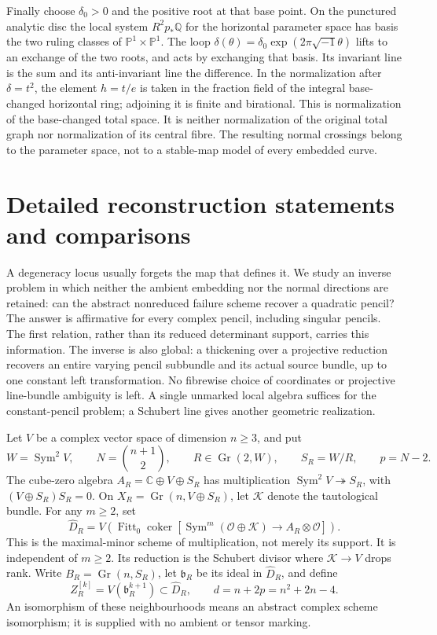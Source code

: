 \documentclass[11pt,reqno]{amsart}
\numberwithin{equation}{section}
\theoremstyle{definition}\newtheorem{definition}[theorem]{Definition}
\theoremstyle{remark}\newtheorem{remark}[theorem]{Remark}
\newcommand{\C}{\mathbb C}\newcommand{\Q}{\mathbb Q}
\newcommand{\Pj}{\mathbb P}\newcommand{\A}{\mathbb A}
\newcommand{\OO}{\mathcal O}\newcommand{\II}{\mathcal I}
\DeclareMathOperator{\Sym}{Sym}\DeclareMathOperator{\Gr}{Gr}
\DeclareMathOperator{\Fitt}{Fitt}\DeclareMathOperator{\Ann}{Ann}
\DeclareMathOperator{\coker}{coker}\DeclareMathOperator{\codim}{codim}
\begin{document}
Finally choose $\delta_0>0$ and the positive root at that base point.
On the punctured analytic disc the local system
$R^2p_*\Q$ for the horizontal parameter space has basis the two
ruling classes of $\Pj^1\times\Pj^1$. The loop
$\delta(\theta)=\delta_0\exp(2\pi\sqrt{-1}\theta)$ lifts to an
exchange of the two roots, and acts by exchanging that basis.
Its invariant line is the sum and its anti-invariant line the
difference. In the normalization after $\delta=t^2$, the element
$h=t/e$ is taken in the fraction field of the integral base-changed
horizontal ring; adjoining it is finite and birational. This is
normalization of the base-changed total space. It is neither
normalization of the original total graph nor normalization of
its central fibre. The resulting normal crossings belong to the
parameter space, not to a stable-map model of every embedded curve.


\section{Detailed reconstruction statements and comparisons}
\label{sec:introduction-v132}

A degeneracy locus usually forgets the map that defines it.  We study
an inverse problem in which neither the ambient embedding nor the
normal directions are retained: can the abstract nonreduced failure
scheme recover a quadratic pencil?  The answer is affirmative for
every complex pencil, including singular pencils.  The first relation, rather than its reduced determinant support,
carries this information.  The inverse is also global: a thickening over a projective reduction
recovers an entire varying pencil subbundle and its actual source
bundle, up to one constant left transformation.  No fibrewise choice
of coordinates or projective line-bundle ambiguity is left.  A
single unmarked local algebra suffices for the constant-pencil
problem; a Schubert line gives another geometric realization.

Let \(V\) be a complex vector space of dimension \(n\ge3\), and put
\[
 W=\Sym^2V,\qquad N=\binom{n+1}{2},\qquad
 R\in\Gr(2,W),\qquad S_R=W/R,\qquad p=N-2.
\]
The cube-zero algebra \(A_R=\C\oplus V\oplus S_R\) has multiplication
\(\Sym^2V\twoheadrightarrow S_R\), with
\((V\oplus S_R)S_R=0\).  On \(X_R=\Gr(n,V\oplus S_R)\), let
\(\mathcal K\) denote the tautological bundle.  For any \(m\ge2\), set
\begin{equation}\label{eq:failure-intro}
 \widehat D_R=V\!\left(\Fitt_0\coker[
 \Sym^m(\OO\oplus\mathcal K)\longrightarrow A_R\otimes\OO]\right).
\end{equation}
This is the maximal-minor scheme of multiplication, not merely its
support.  It is independent of \(m\ge2\).  Its reduction is the
Schubert divisor where \(\mathcal K\to V\) drops rank.  Write
\(B_R=\Gr(n,S_R)\), let \(\mathfrak b_R\) be its ideal in
\(\widehat D_R\), and define
\[
 Z_R^{[k]}=V(\mathfrak b_R^{k+1})\subset\widehat D_R,
       \qquad d=n+2p=n^2+2n-4.
\]
An isomorphism of these neighbourhoods means an abstract complex
scheme isomorphism; it is supplied with no ambient or tensor marking.
\end{document}
